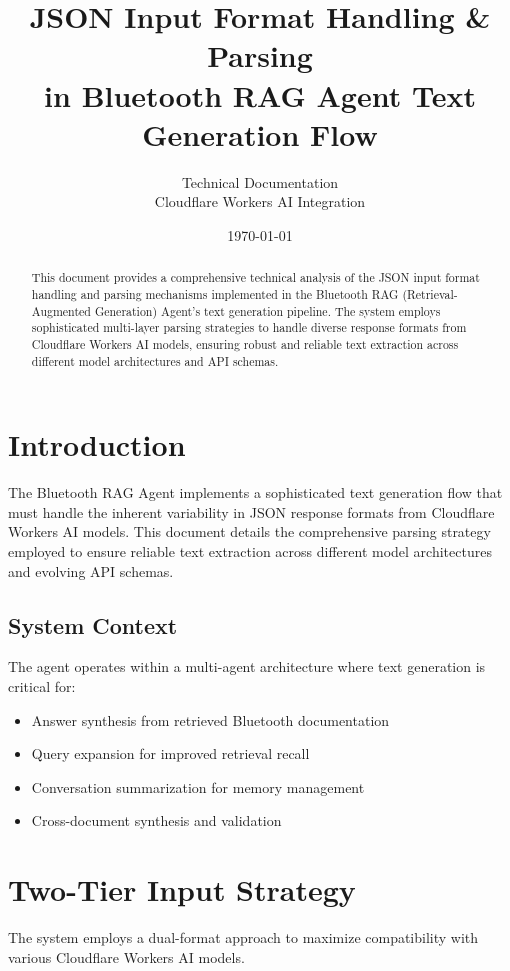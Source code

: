 \documentclass[11pt,a4paper]{article}
\title{\textbf{JSON Input Format Handling \& Parsing\\in Bluetooth RAG Agent Text Generation Flow}}
\author{Technical Documentation\\Cloudflare Workers AI Integration}
\date{\today}
\begin{document}
\maketitle

\begin{abstract}
This document provides a comprehensive technical analysis of the JSON input format handling and parsing mechanisms implemented in the Bluetooth RAG (Retrieval-Augmented Generation) Agent's text generation pipeline. The system employs sophisticated multi-layer parsing strategies to handle diverse response formats from Cloudflare Workers AI models, ensuring robust and reliable text extraction across different model architectures and API schemas.
\end{abstract}

\tableofcontents
\newpage

\section{Introduction}

The Bluetooth RAG Agent implements a sophisticated text generation flow that must handle the inherent variability in JSON response formats from Cloudflare Workers AI models. This document details the comprehensive parsing strategy employed to ensure reliable text extraction across different model architectures and evolving API schemas.

\subsection{System Context}

The agent operates within a multi-agent architecture where text generation is critical for:
\begin{itemize}[itemsep=0pt]
    \item Answer synthesis from retrieved Bluetooth documentation
    \item Query expansion for improved retrieval recall
    \item Conversation summarization for memory management
    \item Cross-document synthesis and validation
\end{itemize}

\section{Two-Tier Input Strategy}

The system employs a dual-format approach to maximize compatibility with various Cloudflare Workers AI models.
\end{document}
